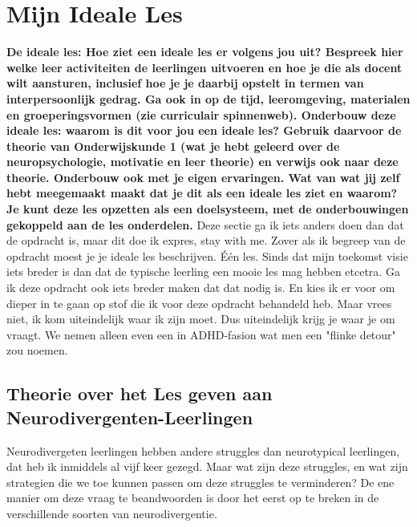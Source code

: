 \documentclass{article}
\begin{document}
    
    \section{Mijn Ideale Les}
        \textbf{De ideale les: Hoe ziet een ideale les er volgens jou uit? Bespreek hier welke leer activiteiten de leerlingen uitvoeren en hoe je die als docent wilt aansturen, inclusief hoe je je daarbij opstelt in termen van interpersoonlijk gedrag. Ga ook in op de tijd, leeromgeving, materialen en groeperingsvormen (zie curriculair spinnenweb). Onderbouw deze ideale les: waarom is dit voor jou een ideale les? Gebruik daarvoor de theorie van Onderwijskunde 1 (wat je hebt geleerd over de neuropsychologie, motivatie en leer theorie) en verwijs ook naar deze theorie. Onderbouw ook met je eigen ervaringen. Wat van wat jij zelf hebt meegemaakt maakt dat je dit als een ideale les ziet en waarom? Je kunt deze les opzetten als een doelsysteem, met de onderbouwingen gekoppeld aan de les onderdelen.}
        \bigskip
        \noindent Deze sectie ga ik iets anders doen dan dat de opdracht is, maar dit doe ik expres, stay with me. Zover als ik begreep van de opdracht moest je je ideale les beschrijven. Één les. Sinds dat mijn toekomst visie iets breder is dan dat de typische leerling een mooie les mag hebben etcetra. Ga ik deze opdracht ook iets breder maken dat dat nodig is. En kies ik er voor om dieper in te gaan op stof die ik voor deze opdracht behandeld heb. 
        \bigskip
        \noindent Maar vrees niet, ik kom uiteindelijk waar ik zijn moet. Dus uiteindelijk krijg je waar je om vraagt. We nemen alleen even een in ADHD-fasion wat men een "flinke detour" zou noemen.
        
        \subsection{Theorie over het Les geven aan Neurodivergenten-Leerlingen}
            Neurodivergeten leerlingen hebben andere struggles dan neurotypical leerlingen, dat heb ik inmiddels al vijf keer gezegd. Maar wat zijn deze struggles, en wat zijn strategien die we toe kunnen passen om deze struggles te verminderen? De ene manier om deze vraag te beandwoorden is door het eerst op te breken in de verschillende soorten van neurodivergentie\cite{neurodivergent-types}. 
            
\end{document}
